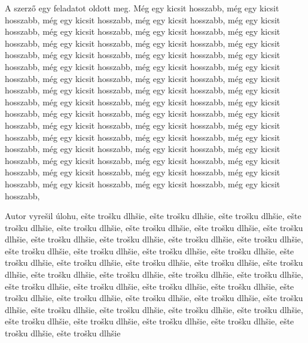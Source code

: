 \documentclass[a4paper,oneside,onecolumn,12pt]{LegrandOrangeBook}
\begin{document}
A szerző egy feladatot oldott meg. Még egy kicsit hosszabb, még egy kicsit hosszabb, még egy kicsit hosszabb, még egy kicsit hosszabb, még egy kicsit hosszabb, még egy kicsit hosszabb, még egy kicsit hosszabb, még egy kicsit hosszabb, még egy kicsit hosszabb, még egy kicsit hosszabb, még egy kicsit hosszabb, még egy kicsit hosszabb, még egy kicsit hosszabb, még egy kicsit hosszabb, még egy kicsit hosszabb, még egy kicsit hosszabb, még egy kicsit hosszabb, még egy kicsit hosszabb, még egy kicsit hosszabb, még egy kicsit hosszabb, még egy kicsit hosszabb, még egy kicsit hosszabb, még egy kicsit hosszabb, még egy kicsit hosszabb, még egy kicsit hosszabb, még egy kicsit hosszabb, még egy kicsit hosszabb, még egy kicsit hosszabb, még egy kicsit hosszabb, még egy kicsit hosszabb, még egy kicsit hosszabb, még egy kicsit hosszabb, még egy kicsit hosszabb, még egy kicsit hosszabb, még egy kicsit hosszabb, még egy kicsit hosszabb, még egy kicsit hosszabb, még egy kicsit hosszabb, még egy kicsit hosszabb, még egy kicsit hosszabb, még egy kicsit hosszabb, még egy kicsit hosszabb, még egy kicsit hosszabb, még egy kicsit hosszabb, még egy kicsit hosszabb, még egy kicsit hosszabb, még egy kicsit hosszabb,  


Autor vyrešil úlohu, ešte trošku dlhšie, ešte trošku dlhšie, ešte trošku dlhšie, ešte trošku dlhšie, ešte trošku dlhšie, ešte trošku dlhšie, ešte trošku dlhšie, ešte trošku dlhšie, ešte trošku dlhšie, ešte trošku dlhšie, ešte trošku dlhšie, ešte trošku dlhšie, ešte trošku dlhšie, ešte trošku dlhšie, ešte trošku dlhšie, ešte trošku dlhšie, ešte trošku dlhšie, ešte trošku dlhšie, ešte trošku dlhšie, ešte trošku dlhšie, ešte trošku dlhšie, ešte trošku dlhšie, ešte trošku dlhšie, ešte trošku dlhšie, ešte trošku dlhšie, ešte trošku dlhšie, ešte trošku dlhšie, ešte trošku dlhšie, ešte trošku dlhšie, ešte trošku dlhšie, ešte trošku dlhšie, ešte trošku dlhšie, ešte trošku dlhšie, ešte trošku dlhšie, ešte trošku dlhšie, ešte trošku dlhšie, ešte trošku dlhšie, ešte trošku dlhšie, ešte trošku dlhšie, ešte trošku dlhšie, ešte trošku dlhšie, ešte trošku dlhšie, ešte trošku dlhšie, ešte trošku dlhšie
\pagebreak

\label{sec:abstrakt}
\end{document}
